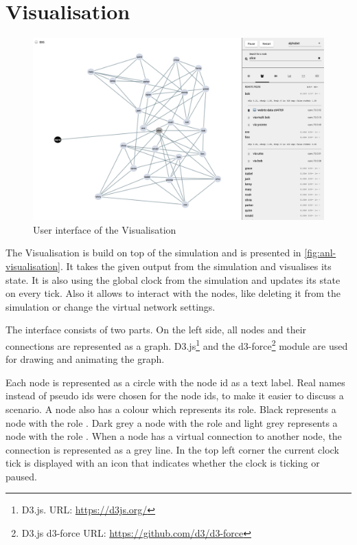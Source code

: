 \section{Visualisation}

\begin{figure}
\centering
\includegraphics[width=1\textwidth]{graphics/analysis-tools/visualisation-overlay.jpg}
\caption{User interface of the Visualisation}
\label{fig:anl-visualisation}
\end{figure}

The Visualisation is build on top of the simulation and is presented in \vref{fig:anl-visualisation}. It takes the given output from the simulation and visualises its state. It is also using the global clock from the simulation and updates its state on every tick. Also it allows to interact with the nodes, like deleting it from the simulation or change the virtual network settings.

The interface consists of two parts. On the left side, all nodes and their connections are represented as a graph. D3.js\footnote{D3.js. URL: \url{https://d3js.org/}} and the d3-force\footnote{D3.js d3-force URL: \url{https://github.com/d3/d3-force}} module are used for drawing and animating the graph.

Each node is represented as a circle with the node id as a text label. Real names instead of pseudo ids were chosen for the node ids, to make it easier to discuss a scenario. A node also has a colour which represents its role. Black represents a node with the role \signal. Dark grey a node with the role \router and light grey represents a node with the role \peer.
When a node has a virtual connection to another node, the connection is represented as a grey line.
In the top left corner the current clock tick is displayed with an icon that indicates whether the clock is ticking or paused.

